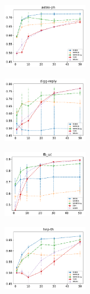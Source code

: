 
\begin{subfigure}
     \centering
         \includegraphics[width=0.32\textwidth]{fig/astro-ph__entropy@_roc_evo2}
\end{subfigure}
\begin{subfigure}
         \centering
      \includegraphics[width=0.32\textwidth]{fig/digg-reply__entropy@_roc_evo2}               
\end{subfigure}                                                                          
\begin{subfigure}                                                                        
         \centering                                                                      
      \includegraphics[width=0.32\textwidth]{fig/fb_uc__entropy@_roc_evo2}
\end{subfigure}                                                                          
\begin{subfigure}                                                                        
         \centering                                                                      
      \includegraphics[width=0.32\textwidth]{fig/hep-th__entropy@_roc_evo2}
\end{subfigure}                                                                          
